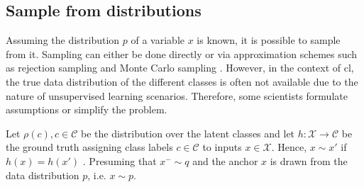 
\subsection{Sample from distributions}
\label{subsec:SampleViaDistribution}

Assuming the distribution $p$ of a variable $x$ is known, it is possible to sample from it.
Sampling can either be done directly or 
via approximation schemes such as rejection sampling and Monte Carlo sampling \citet{robinson_contrastive_2021}.
However, in the context of \ac{cl}, the true data distribution of the different classes is often not available 
due to the nature of unsupervised learning scenarios.
Therefore, some scientists formulate assumptions or simplify the problem.

Let $\rho(c), c \in \mathcal{C}$ be the distribution over the latent classes and 
let $h: \mathcal{X} \rightarrow \mathcal{C}$ be the ground truth assigning class labels $c \in \mathcal{C}$ to inputs $x \in \mathcal{X}$.
Hence, $x \sim x'$ if $h(x) = h(x')$ \citet{robinson_contrastive_2021,chuang_debiased_2020}.
Presuming that $x^- \sim q$ and the anchor $x$ %
is drawn from the data distribution $p$, i.e. $x \sim p$.








